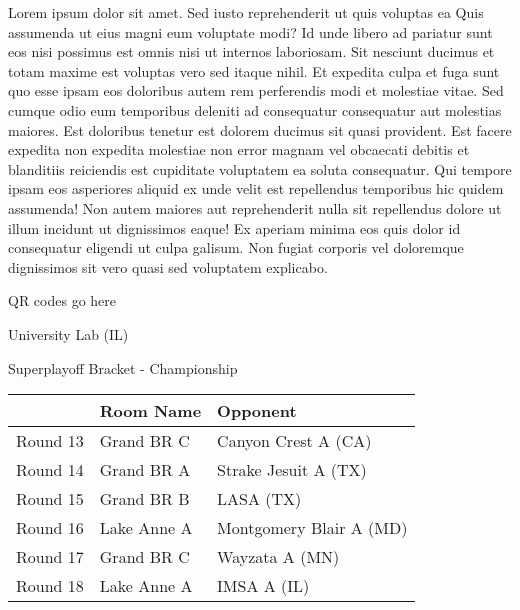 \documentclass{article}%
\begin{document}
\vspace*{8pt}%
\linebreak%
\newline%
\newline%
Lorem ipsum dolor sit amet. Sed iusto reprehenderit ut quis voluptas ea Quis assumenda ut eius magni eum voluptate modi? Id unde libero ad pariatur sunt eos nisi possimus est omnis nisi ut internos laboriosam. Sit nesciunt ducimus et totam maxime est voluptas vero sed itaque nihil. Et expedita culpa et fuga sunt quo esse ipsam eos doloribus autem rem perferendis modi et molestiae vitae.\newline%
\newline%
Sed cumque odio eum temporibus deleniti ad consequatur consequatur aut molestias maiores. Est doloribus tenetur est dolorem ducimus sit quasi provident. Est facere expedita non expedita molestiae non error magnam vel obcaecati debitis et blanditiis reiciendis est cupiditate voluptatem ea soluta consequatur. Qui tempore ipsam eos asperiores aliquid ex unde velit est repellendus temporibus hic quidem assumenda!\newline%
\newline%
Non autem maiores aut reprehenderit nulla sit repellendus dolore ut illum incidunt ut dignissimos eaque! Ex aperiam minima eos quis dolor id consequatur eligendi ut culpa galisum. Non fugiat corporis vel doloremque dignissimos sit vero quasi sed voluptatem explicabo.\newline%
\newline%
%
\vspace*{30pt}%
\begin{center}%
\begin{Huge}%
QR codes go here%
\end{Huge}%
\end{center}%
\newpage%
\begin{center}%
\begin{Huge}%
University Lab (IL)%
\end{Huge}%
\vspace*{8pt}%
\linebreak%
\begin{Large}%
Superplayoff Bracket {-} Championship%
\end{Large}%
\end{center}%
%
\begin{tabularx}{\textwidth}{|c|Y|Y|}%
\hline%
&Room Name&Opponent\\%
\hline%
Round 13&Grand BR C&Canyon Crest A (CA)\\%
Round 14&Grand BR A&Strake Jesuit A (TX)\\%
Round 15&Grand BR B&LASA (TX)\\%
Round 16&Lake Anne A&Montgomery Blair A (MD)\\%
Round 17&Grand BR C&Wayzata A (MN)\\%
Round 18&Lake Anne A&IMSA A (IL)\\%
\hline%
\end{tabularx}%
\end{document}
